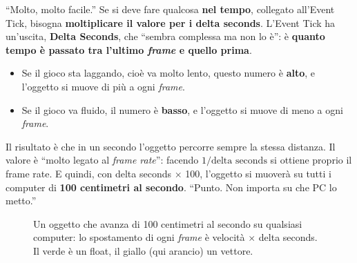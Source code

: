 ``Molto, molto facile.'' Se si deve fare qualcosa \textbf{nel tempo},
collegato all'Event Tick, bisogna \textbf{moltiplicare il valore per i delta
seconds}. L'Event Tick ha un'uscita, \textbf{Delta Seconds}, che ``sembra
complessa ma non lo è'': è \textbf{quanto tempo è passato tra l'ultimo
\emph{frame} e quello prima}.
\begin{itemize}
  \item Se il gioco sta laggando, cioè va molto lento, questo numero è
        \textbf{alto}, e l'oggetto si muove di più a ogni \emph{frame}.
  \item Se il gioco va fluido, il numero è \textbf{basso}, e l'oggetto si
        muove di meno a ogni \emph{frame}.
\end{itemize}
Il risultato è che in un secondo l'oggetto percorre sempre la stessa
distanza. Il valore è ``molto legato al \emph{frame rate}'': facendo
$1 / \text{delta seconds}$ si ottiene proprio il frame rate. E quindi, con
delta seconds $\times$ 100, l'oggetto si muoverà su tutti i computer di
\textbf{100 centimetri al secondo}. ``Punto. Non importa su che PC lo
metto.''

\begin{figure}[htbp]
\centering
{}
\caption{Un oggetto che avanza di 100 centimetri al secondo su qualsiasi
computer: lo spostamento di ogni \emph{frame} è velocità $\times$ delta seconds.
Il verde è un float, il giallo (qui arancio) un vettore.}
\label{gd7:fig:delta}
\end{figure}

